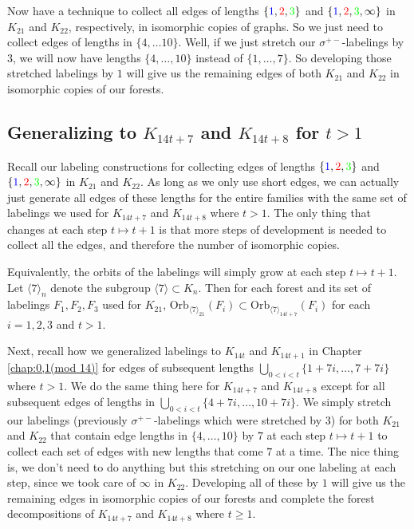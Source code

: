   Now have a technique to collect all edges of lengths $\{\textcolor{blue}{1},\textcolor{red}{2},\textcolor{green}{3}\}$ and $\{\textcolor{blue}{1},\textcolor{red}{2},\textcolor{green}{3},\infty\}$ in $K_{21}$ and $K_{22}$, respectively, in isomorphic copies of graphs. So we just need to collect edges of lengths in $\{4,\hdots 10\}$. Well, if we just stretch our $\sigma^{+-}$-labelings by $3$, we will now have lengths $\{4,\hdots,10\}$ instead of $\{1,\hdots,7\}$. So developing those stretched labelings by $1$ will give us the remaining edges of both $K_{21}$ and $K_{22}$ in isomorphic copies of our forests.
  \subsection{Generalizing to $K_{14t+7}$ and $K_{14t+8}$ for $t>1$}\label{sec:7,8constrgen}

  Recall our labeling constructions for collecting edges of lengths $\{\textcolor{blue}{1},\textcolor{red}{2},\textcolor{green}{3}\}$ and $\{\textcolor{blue}{1},\textcolor{red}{2},\textcolor{green}{3},\infty\}$ in $K_{21}$ and $K_{22}$. As long as we only use short edges, we can actually just generate all edges of these lengths for the entire families with the same set of labelings we used for $K_{14t+7}$ and $K_{14t+8}$ where $t>1$. The only thing that changes at each step $t\mapsto t+1$ is that more steps of development is needed to collect all the edges, and therefore the number of isomorphic copies.
  
  Equivalently, the orbits of the labelings will simply grow at each step $t\mapsto t+1$. Let $\langle 7\rangle_{n}$ denote the subgroup $\langle 7\rangle\subset K_{n}$. Then for each forest and its set of labelings $F_{1},F_{2},F_{3}$ used for $K_{21}$, $\mathrm{Orb}_{\langle 7\rangle_{21}}(F_{i})\subset \mathrm{Orb}_{\langle 7\rangle_{14t+7}}(F_{i})$ for each $i=1,2,3$ and $t>1$.
  
  Next, recall how we generalized labelings to $K_{14t}$ and $K_{14t+1}$ in Chapter \ref{chap:0,1(mod 14)} for edges of subsequent lengths $\bigcup_{0<i<t}\{1+7i,\hdots,7+7i\}$ where $t>1$. We do the same thing here for $K_{14t+7}$ and $K_{14t+8}$ except for all subsequent edges of lengths in $\bigcup\limits_{0<i<t}\{4+7i,\hdots,10+7i\}$. We simply stretch our labelings (previously $\sigma^{+-}$-labelings which were stretched by $3$) for both $K_{21}$ and $K_{22}$ that contain edge lengths in $\{4,\hdots, 10\}$ by $7$ at each step $t\mapsto t+1$ to collect each set of edges with new lengths that come $7$ at a time. The nice thing is, we don't need to do anything but this stretching on our one labeling at each step, since we took care of $\infty$ in $K_{22}$. Developing all of these by $1$ will give us the remaining edges in isomorphic copies of our forests and complete the forest decompositions of $K_{14t+7}$ and $K_{14t+8}$ where $t\geq 1$.
  \newline

